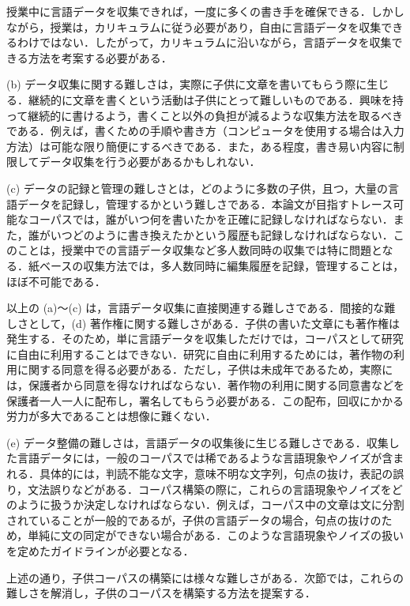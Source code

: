 \documentclass[japanese]{jnlp_1.4}
\begin{document}
  授業中に言語データを収集できれば，一度に多くの書き手を確保できる．しかしながら，授業は，カリキュラムに従う必要があり，自由に言語データを収集できるわけではない．したがって，カリキュラムに沿いながら，言語データを収集できる方法を考案する必要がある．


  (b) データ収集に関する難しさは，実際に子供に文章を書いてもらう際に生じる．継続的に文章を書くという活動は子供にとって難しいものである．興味を持って継続的に書けるよう，書くこと以外の負担が減るような収集方法を取るべきである．例えば，書くための手順や書き方（コンピュータを使用する場合は入力方法）は可能な限り簡便にするべきである．また，ある程度，書き易い内容に制限してデータ収集を行う必要があるかもしれない．


  (c) データの記録と管理の難しさとは，どのように多数の子供，且つ，大量の言語データを記録し，管理するかという難しさである．本論文が目指すトレース可能なコーパスでは，誰がいつ何を書いたかを正確に記録しなければならない．また，誰がいつどのように書き換えたかという履歴も記録しなければならない．このことは，授業中での言語データ収集など多人数同時の収集では特に問題となる．紙ベースの収集方法では，多人数同時に編集履歴を記録，管理することは，ほぼ不可能である．


  以上の (a)〜(c) は，言語データ収集に直接関連する難しさである．間接的な難しさとして，(d) 著作権に関する難しさがある．子供の書いた文章にも著作権は発生する．そのため，単に言語データを収集しただけでは，コーパスとして研究に自由に利用することはできない．研究に自由に利用するためには，著作物の利用に関する同意を得る必要がある．ただし，子供は未成年であるため，実際には，保護者から同意を得なければならない．著作物の利用に関する同意書などを保護者一人一人に配布し，署名してもらう必要がある．この配布，回収にかかる労力が多大であることは想像に難くない．


  (e) データ整備の難しさは，言語データの収集後に生じる難しさである．収集した言語データには，一般のコーパスでは稀であるような言語現象やノイズが含まれる．具体的には，判読不能な文字，意味不明な文字列，句点の抜け，表記の誤り，文法誤りなどがある．コーパス構築の際に，これらの言語現象やノイズをどのように扱うか決定しなければならない．例えば，コーパス中の文章は文に分割されていることが一般的であるが，子供の言語データの場合，句点の抜けのため，単純に文の同定ができない場合がある．このような言語現象やノイズの扱いを定めたガイドラインが必要となる．


  上述の通り，子供コーパスの構築には様々な難しさがある．次節では，これらの難しさを解消し，子供のコーパスを構築する方法を提案する．

	
\end{document}
